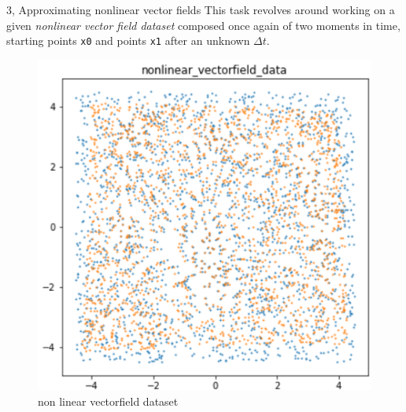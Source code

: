 \documentclass[10pt,a4paper]{article}
\begin{document}
\begin{task}{3, Approximating nonlinear vector fields}
This task revolves around working on a given \textit{nonlinear vector field dataset} composed once again of two moments in time, starting points \texttt{x0} and points \texttt{x1} after an unknown $\Delta t$.  
\begin{figure}[H]
    \centering
    \includegraphics[scale=0.5]{images/task3_data.png}
    \caption{non linear vectorfield dataset}
    \label{fig:task3-data}
\end{figure}

\end{task}
\end{document}
